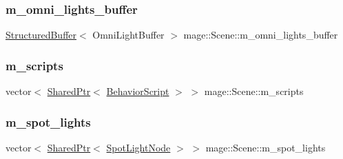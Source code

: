 \subsubsection{\texorpdfstring{m\+\_\+omni\+\_\+lights\+\_\+buffer}{m\_omni\_lights\_buffer}}
{\footnotesize\ttfamily \hyperlink{structmage_1_1_structured_buffer}{Structured\+Buffer}$<$ Omni\+Light\+Buffer $>$ mage\+::\+Scene\+::m\+\_\+omni\+\_\+lights\+\_\+buffer\hspace{0.3cm}{\ttfamily [private]}}

\hypertarget{classmage_1_1_scene_a84548bf6978f8955ce5892cb23536a4e}{}\label{classmage_1_1_scene_a84548bf6978f8955ce5892cb23536a4e} 
\subsubsection{\texorpdfstring{m\+\_\+scripts}{m\_scripts}}
{\footnotesize\ttfamily vector$<$ \hyperlink{namespacemage_a1e01ae66713838a7a67d30e44c67703e}{Shared\+Ptr}$<$ \hyperlink{classmage_1_1_behavior_script}{Behavior\+Script} $>$ $>$ mage\+::\+Scene\+::m\+\_\+scripts\hspace{0.3cm}{\ttfamily [private]}}

\hypertarget{classmage_1_1_scene_a4e1954bc0b812d6a71123ca3ac9eeb75}{}\label{classmage_1_1_scene_a4e1954bc0b812d6a71123ca3ac9eeb75} 
\subsubsection{\texorpdfstring{m\+\_\+spot\+\_\+lights}{m\_spot\_lights}}
{\footnotesize\ttfamily vector$<$ \hyperlink{namespacemage_a1e01ae66713838a7a67d30e44c67703e}{Shared\+Ptr}$<$ \hyperlink{namespacemage_a46c8f54b869a5dc07f520c600b9046bd}{Spot\+Light\+Node} $>$ $>$ mage\+::\+Scene\+::m\+\_\+spot\+\_\+lights\hspace{0.3cm}{\ttfamily [private]}}

\hypertarget{classmage_1_1_scene_a64118c052d728ac988031898fd2d757d}{}\label{classmage_1_1_scene_a64118c052d728ac988031898fd2d757d} 
